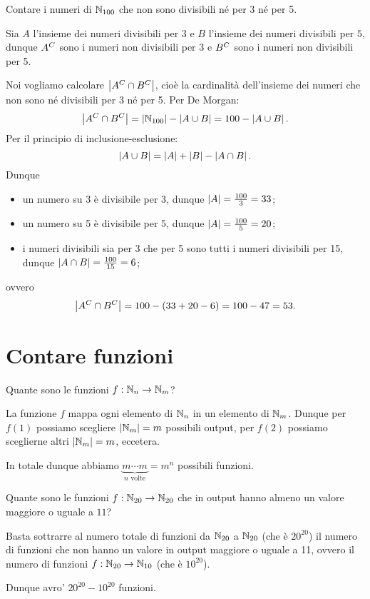 \begin{example}
    Contare i numeri di $\mathbb{N}_{100}$ che non sono divisibili né per 3 né per 5.
\end{example}
\begin{solution}
    Sia $A$ l'insieme dei numeri divisibili per $3$ e $B$ l'insieme dei numeri divisibili per $5$, dunque $A^C$ sono i numeri non divisibili per 3 e $B^C$ sono i numeri non divisibili per 5.
    
    Noi vogliamo calcolare $\left|A^C \cap B^C\right|$, cioè la cardinalità dell'insieme dei numeri che non sono né divisibili per 3 né per 5.
    Per De Morgan: \[
        \left|A^C \cap B^C\right| = \left|\mathbb{N}_{100}\right| - \left|A \cup B\right| = 100 - \left|A \cup B\right|. 
    \] Per il principio di inclusione-esclusione: \[
        \left|A \cup B\right| = \left|A\right| + \left|B\right| - \left|A \cap B\right|. 
    \]
    Dunque \begin{itemize}
        \item un numero su 3 è divisibile per 3, dunque $\left|A\right| = \frac{100}{3} = 33$;
        \item un numero su 5 è divisibile per 5, dunque $\left|A\right| = \frac{100}{5} = 20$;
        \item i numeri divisibili sia per 3 che per 5 sono tutti i numeri divisibili per 15, dunque $\left|A \cap B\right| = \frac{100}{15} = 6$;
    \end{itemize}
    ovvero \[
        \left|A^C \cap B^C\right| = 100 - (33+20-6) = 100 - 47 = 53.
    \]
\end{solution}

\section{Contare funzioni}
\begin{example}
    Quante sono le funzioni $f : \mathbb{N}_n \to \mathbb{N}_m$?
\end{example}
\begin{solution}
    La funzione $f$ mappa ogni elemento di $\mathbb{N}_n$ in un elemento di $\mathbb{N}_m$. Dunque per $f(1)$ possiamo scegliere $\left|\mathbb{N}_m\right| = m$ possibili output, per $f(2)$ possiamo sceglierne altri $\left|\mathbb{N}_m\right| = m$, eccetera. 
    
    In totale dunque abbiamo $\underbrace{m \cdots m}_{n \text{ volte}} = m^n$ possibili funzioni.
\end{solution}

\begin{example}
    Quante sono le funzioni $f : \mathbb{N}_{20} \to \mathbb{N}_{20}$ che in output hanno almeno un valore maggiore o uguale a $11$?
\end{example}
\begin{solution}
    Basta sottrarre al numero totale di funzioni da $\mathbb{N}_{20}$ a $\mathbb{N}_{20}$ (che è $20^{20}$) il numero di funzioni che non hanno un valore in output maggiore o uguale a 11, ovvero il numero di funzioni $f : \mathbb{N}_{20} \to \mathbb{N}_{10}$ (che è $10^{20}$).


    Dunque avro' $20^{20} - 10^{20}$ funzioni.
\end{solution}

